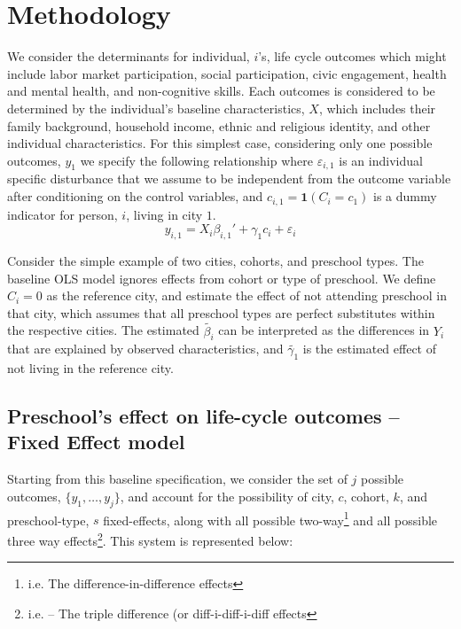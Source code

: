 \documentclass[10pt]{article}
\begin{document}
\section{Methodology}
We consider the determinants for individual, $i$'s, life cycle outcomes which might include labor market participation, social participation, civic engagement, health and mental health, and non-cognitive skills. Each outcomes is considered to be determined by the individual's baseline characteristics, $X$, which includes their family background, household income, ethnic and religious identity, and other individual characteristics. For this simplest  case, considering only one possible outcomes, $y_1$ we specify the following relationship  where $\varepsilon_{i,1}$ is an individual specific disturbance that we assume to be independent from the outcome variable after conditioning on the control variables, and $c_{i,1} = \mathbf{1}(C_i = c_1)$ is a dummy indicator for person, $i$, living in city $1$. \\

\begin{equation} \label{ols}
y_{i,1} =  X_i \beta_{i,1}' + \gamma_1 c_{i} + \varepsilon_{i}
\end{equation}

Consider the simple example of two cities, cohorts, and preschool types. The baseline OLS model ignores effects from cohort or type of preschool. We define $C_i = 0$ as the reference city, and estimate the effect of not attending preschool in that city, which assumes that all preschool types are perfect substitutes within the respective cities.  The estimated $\tilde{\beta_{i}}$ can be interpreted as the differences in $Y_i$ that are explained by observed characteristics, and  $\tilde{\gamma_1}$ is the estimated effect of not living in the reference city. 


\subsection{Preschool's effect on life-cycle outcomes -- Fixed Effect model}
Starting from this baseline specification, we consider the set of $j$ possible outcomes, $\{y_1, \dots, y_j\}$, and account for the possibility of city, $c$, cohort, $k$, and preschool-type, $s$ fixed-effects, along with all possible two-way\footnote{i.e. The difference-in-difference effects} and all possible three way effects\footnote{i.e. -- The triple difference (or diff-i-diff-i-diff effects}. This system is represented below:
\end{document}
